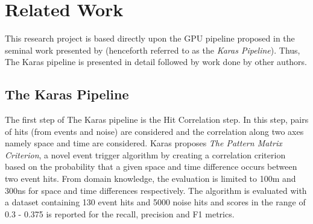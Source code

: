 \chapter{Related Work}

This research project is based directly upon the GPU pipeline proposed
in the seminal work presented by \citeauthor{karas2019data}
(henceforth referred to as the \textit{Karas Pipeline}). Thus,
The Karas pipeline is presented in detail followed by work done by
other authors.

\section{The Karas Pipeline}
\label{sec:karas-pipeline}

The first step of The Karas pipeline is the Hit Correlation step. In
this step, pairs of hits (from events and noise) are considered and
the correlation along two axes namely space and time are considered.
Karas proposes \textit{The Pattern Matrix Criterion}, a novel event
trigger algorithm by creating a correlation criterion based on the
probability that a given space and time difference occurs between two
event hits. From domain knowledge, the evaluation is limited to 100m
and 300ns for space and time differences respectively. The algorithm
is evaluated with a dataset containing 130 event hits and 5000 noise
hits and scores in the range of 0.3 - 0.375 is reported for the
recall, precision and F1 metrics.
